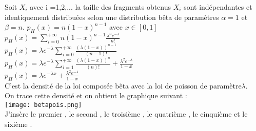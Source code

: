 \documentclass{book}
\begin{document}
Soit $X_i$ avec i =1,2,... la taille des fragments obtenus 
$X_i$ sont indépendantes et identiquement distribuées selon une distribution bêta de paramètres $\alpha = 1$ et $\beta=n$.
$p_{H}(x) =n(1-x)^{n-1}$ avec $x\in[0,1]$\\
$p_{H}(x) = \sum_{i=0}^{+\infty}n(1-x)^{n-1}\frac{\lambda^{n}e^{-\lambda}}{n!}$\\
$p_{H}(x)= \lambda e^{-\lambda}\sum_{i=0}^{+\infty}\frac{(\lambda (1-x))^{n-1}}{(n-1)!}$ \\
$p_{H}(x)= \lambda e^{-\lambda}\sum_{i=1}^{+\infty}\frac{(\lambda (1-x))^{n}}{(n)!} + \frac{\lambda^{2}e^{-\lambda}}{1-x}$ \\
$p_{H}(x)= \lambda e^{-\lambda x} + \frac{\lambda^{2}e^{-\lambda}}{1-x}$ \\
C'est la densité de la loi composée bêta avec la loi de poisson de paramètre$\lambda$. \\
On trace cette densité et on obtient le graphique suivant : \\
\texttt{[image: betapois.png]}\\
J'insère le premier \cite{ref}, le second \cite{ref2}, le troisième \cite{ref3}, le quatrième \cite{ref4}, le cinquième \cite{ref5} et le sixième \cite{ref6}.


\end{document}
